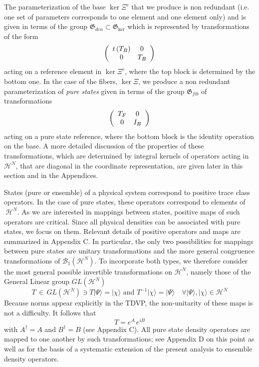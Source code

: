 \documentclass[aps,preprint]{revtex4}%
\begin{document}
The parameterization of the base $\ker\Xi^{c}$ that we produce is non
redundant (i.e. one set of parameters corresponds to one element and one
element only) and is given in terms of the group $\mathfrak{G}_{den}%
\subset\mathfrak{G}_{\ker}$ which is represented by transformations of the
form
\begin{equation}
\left(
\begin{array}
[c]{cc}%
t\left(  T_{B}\right)  & 0\\
0 & T_{B}%
\end{array}
\right)
\end{equation}
acting on a reference element in $\ker\Xi^{c}$, where the top block is
determined by the bottom one. In the case of the fibers, $\ker\Xi$, we produce
a non redundant parameterization of \textit{pure states }given in terms of the
group $\mathfrak{G}_{fib}$ of transformations
\begin{equation}
\left(
\begin{array}
[c]{cc}%
T_{F} & 0\\
0 & I_{B}%
\end{array}
\right)
\end{equation}
acting on a pure state reference, where the bottom block is the identity
operation on the base. A more detailed discussion of the properties of these
transformations, which are determined by integral kernels of operators acting
in $\mathcal{H}^{N}$, that are diagonal in the coordinate representation, are
given later in this section and in the Appendices.

States (pure or ensemble) of a physical system correspond to positive trace
class operators. In the case of pure states, these operators correspond to
elements of $\ \mathcal{H}^{N}$. As we are interested in mappings between
states, positive maps of such operators are critical. Since all physical
densities can be associated with pure states, we focus on them. Relevant
details of positive operators and maps are summarized in Appendix C. In
particular, the only two possibilities for mappings between pure states are
unitary transformations and the more general congruence
transformations\cite{congruence} of $\mathcal{B}_{1}\left(  \mathcal{H}%
^{N}\right)  $. To incorporate both types, we therefore consider the most
general possible invertible transformations on $\mathcal{H}^{N}$, namely those
of the General Linear group $GL(\mathcal{H}^{N})$
\begin{equation}
T\,\in\,GL(\mathcal{H}^{N})\ni T|\Psi\rangle=|\chi\rangle\text{ and }%
T^{-1}|\chi\rangle=|\Psi\rangle\quad\forall|\Psi\rangle,|\chi\rangle
\in\mathcal{H}^{N}%
\end{equation}
Because norms appear explicitly in the TDVP, the non-unitarity of these maps
is not a difficulty. It follows that
\begin{equation}
T=e^{A}\,e^{iB} \label{eAeiB}%
\end{equation}
with $A^{\dagger}=A$ and $B^{\dagger}=B$ (see Appendix C). All pure state
density operators are mapped to one another by such transformations; see
Appendix D on this point as well as for the basis of a systematic extension of
the present analysis to ensemble density operators.
\end{document}

